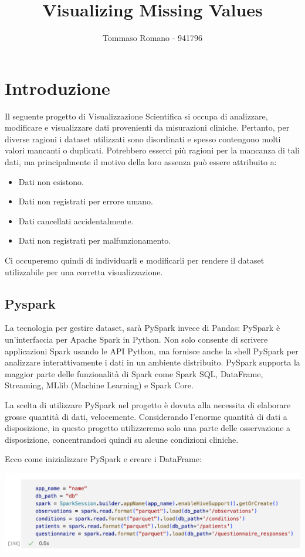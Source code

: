 \documentclass[11pt, oneside]{article}
\title{Visualizing Missing Values}
\author{Tommaso Romano - 941796}
\begin{document}
\maketitle

\tableofcontents
\pagebreak
\section{Introduzione}

Il seguente progetto di Visualizzazione Scientifica si occupa di analizzare, modificare e visualizzare dati provenienti da misurazioni cliniche. Pertanto, per diverse ragioni i dataset utilizzati sono disordinati e spesso contengono molti valori mancanti o duplicati. Potrebbero esserci più ragioni per la mancanza di tali dati, ma principalmente il motivo della loro assenza può essere attribuito a:
\begin{itemize}
\item Dati non esistono.
\item Dati non registrati per errore umano.
\item Dati cancellati accidentalmente.
\item Dati non registrati per malfunzionamento.
\end{itemize}

Ci occuperemo quindi di individuarli e modificarli per rendere il dataset utilizzabile per una corretta visualizzazione.

\subsection{Pyspark}

La tecnologia per gestire dataset, sarà PySpark invece di Pandas: PySpark è un'interfaccia per Apache Spark in Python. Non solo consente di scrivere applicazioni Spark usando le API Python, ma fornisce anche la shell PySpark per analizzare interattivamente i dati in un ambiente distribuito. PySpark supporta la maggior parte delle funzionalità di Spark come Spark SQL, DataFrame, Streaming, MLlib (Machine Learning) e Spark Core.

La scelta di utilizzare PySpark nel progetto è dovuta alla necessita di elaborare grosse quantità di dati, velocemente. Considerando l'enorme quantità di dati a disposizione, in questo progetto utilizzeremo solo una parte delle osservazione a disposizione, concentrandoci quindi su alcune condizioni cliniche. 

Ecco come inizializzare PySpark e creare i DataFrame:
\begin{center}
\includegraphics[scale=0.5]{1_init.png}
\end{center}
\end{document}
